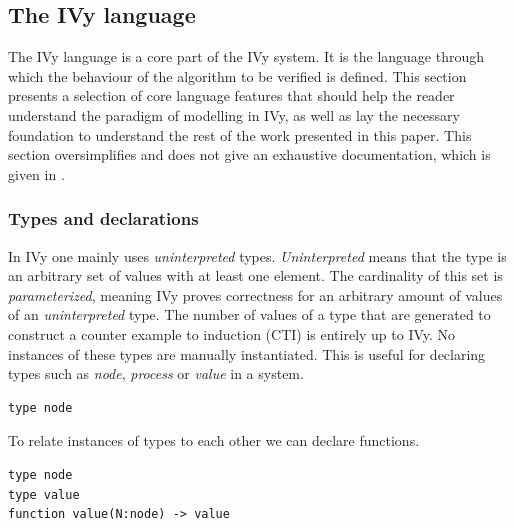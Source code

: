 \documentclass[fleqn]{article}
\begin{document}
\subsection{The IVy language}
The IVy language is a core part of the IVy system. It is the language through which the behaviour of the algorithm to be verified is defined.
This section presents a selection of core language features that should help the reader understand the paradigm of modelling in IVy, as well as lay the necessary foundation to understand
the rest of the work presented in this paper. This section oversimplifies and does not give an exhaustive documentation, which is given in \cite{refLanguageDoc}.

\subsubsection{Types and declarations}
In IVy one mainly uses \textit{uninterpreted} types. \textit{Uninterpreted} means that the type is an arbitrary set of values with at least one element.
The cardinality of this set is \textit{parameterized}, meaning IVy proves correctness for an arbitrary amount of values of an \textit{uninterpreted} type.
The number of values of a type that are generated to construct a counter example to induction (CTI) is entirely up to IVy. No instances of these types are manually instantiated.
This is useful for declaring types such as \textit{node}, \textit{process} or \textit{value} in a system.

\begin{mdframed}[nobreak=true, backgroundcolor=light-gray, roundcorner=10pt,leftmargin=1, rightmargin=1, innerleftmargin=15, innertopmargin=15,innerbottommargin=15, outerlinewidth=1, linecolor=light-gray]
\begin{lstlisting}
type node
\end{lstlisting}
\end{mdframed}

\noindent To relate instances of types to each other we can declare functions.

\begin{mdframed}[nobreak=true, backgroundcolor=light-gray, roundcorner=10pt,leftmargin=1, rightmargin=1, innerleftmargin=15, innertopmargin=15,innerbottommargin=15, outerlinewidth=1, linecolor=light-gray]
\begin{lstlisting}
type node
type value
function value(N:node) -> value
\end{lstlisting}
\end{mdframed}
\end{document}
